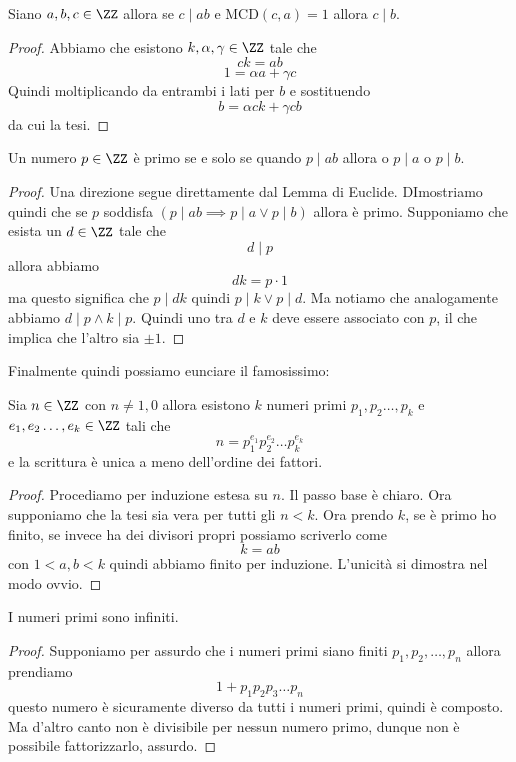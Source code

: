 \documentclass[11pt]{scrartcl}
\newcommand{\MCD}{\text{MCD}}
\begin{document}
	\begin{lemma}
		Siano $a,b,c\in\ZZ$ allora se $c\mid ab$ e $\MCD(c,a)=1$ allora $c\mid b$.
	\end{lemma}
	\begin{proof}
		Abbiamo che esistono $k,\alpha,\gamma\in\ZZ$ tale che 
		$$ck=ab$$
		$$1=\alpha a + \gamma c$$
		Quindi moltiplicando da entrambi i lati per $b$ e sostituendo
		$$b=\alpha c k + \gamma c b$$
		da cui la tesi.
	\end{proof}
	\begin{theorem}
		Un numero $p\in\ZZ$ è primo se e solo se quando $p\mid ab$ allora o $p\mid a$ o $p\mid b$.
	\end{theorem}
	\begin{proof}
		Una direzione segue direttamente dal Lemma di Euclide. DImostriamo quindi che se $p$ soddisfa $(p\mid ab \implies p\mid a \lor p\mid b)$ allora è primo. Supponiamo che esista un $d\in\ZZ$ tale che
		$$d\mid p$$
		allora abbiamo
		$$dk=p\cdot 1$$
		ma questo significa che $p\mid dk$ quindi $p\mid k \lor p\mid d$. Ma notiamo che analogamente abbiamo $d\mid p \land k\mid p$. Quindi uno tra $d$ e $k$ deve essere associato con $p$, il che implica che l'altro sia $\pm 1$.
	\end{proof}
	Finalmente quindi possiamo eunciare il famosissimo:
	\begin{theorem}
		Sia $n\in\ZZ$ con $n\ne 1,0$ allora esistono $k$ numeri primi $p_1,p_2\dots,p_k$ e $e_1,e_2\dots,e_k\in\ZZ$ tali che
		$$n=p_1^{e_1}p_2^{e_2}\dots p_k^{e_k}$$
		e la scrittura è unica a meno dell'ordine dei fattori.
	\end{theorem}
	\begin{proof}
		Procediamo per induzione estesa su $n$. Il passo base è chiaro. Ora supponiamo che la tesi sia vera per tutti gli $n<k$. Ora prendo $k$, se è primo ho finito, se invece ha dei divisori propri possiamo scriverlo come 
		$$k=ab$$
		con $1<a,b<k$ quindi abbiamo finito per induzione. L'unicità si dimostra nel modo ovvio.
	\end{proof}
	\begin{lemma}
		I numeri primi sono infiniti.
	\end{lemma}
	\begin{proof}
		Supponiamo per assurdo che i numeri primi siano finiti $p_1,p_2,\dots,p_n$ allora prendiamo
		$$1+p_1p_2p_3\dots p_n$$
		questo numero è sicuramente diverso da tutti i numeri primi, quindi è composto. Ma d'altro canto non è divisibile per nessun numero primo, dunque non è possibile fattorizzarlo, assurdo. 
	\end{proof}
\end{document}
